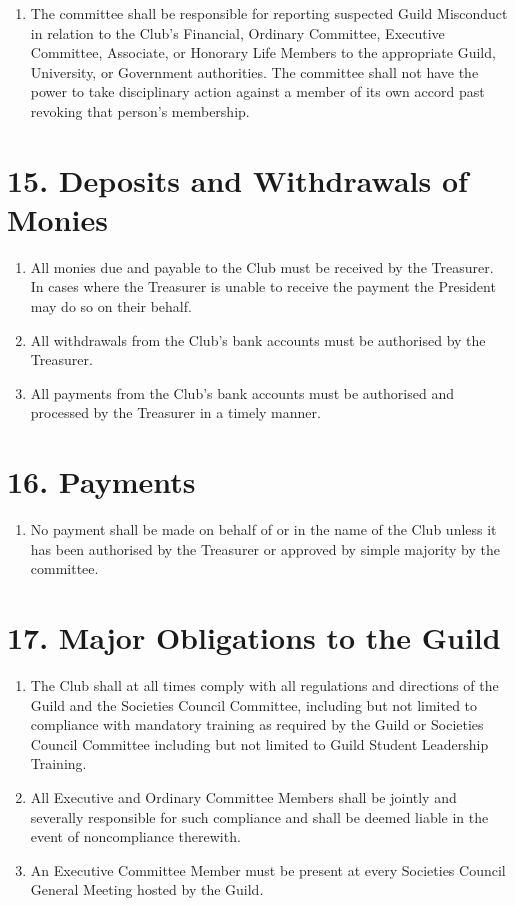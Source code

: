 \documentclass[12pt]{article}
\begin{document}
\begin{enumerate}[label=14.\arabic*]
\item The committee shall be responsible for reporting suspected Guild Misconduct in relation to the Club's Financial, Ordinary Committee, Executive Committee, Associate, or Honorary Life Members to the appropriate Guild, University, or Government authorities. The committee shall not have the power to take disciplinary action against a member of its own accord past revoking that person's membership.
\end{enumerate}

\section{15. Deposits and Withdrawals of Monies}
\begin{enumerate}[label=15.\arabic*]
 \item All monies due and payable to the Club must be received by the Treasurer. In cases where the Treasurer is unable to receive the payment the President may do so on their behalf.
\item All withdrawals from the Club's bank accounts must be authorised by the Treasurer.
\item All payments from the Club's bank accounts must be authorised and processed by the Treasurer in a timely manner.
\end{enumerate}
%
\section{16. Payments}
\begin{enumerate}[label=16.\arabic*]
 \item No payment shall be made on behalf of or in the name of the Club unless it has been authorised by the Treasurer or approved by simple majority by the committee.
\end{enumerate}

\section{17. Major Obligations to the Guild}
\begin{enumerate}[label=17.\arabic*]
 \item The Club shall at all times comply with all regulations and directions of the Guild and the Societies Council Committee, including but not limited to compliance with mandatory training as required by the Guild or Societies Council Committee including but not limited to Guild Student Leadership Training.
\item All Executive and Ordinary Committee Members shall be jointly and severally responsible for such compliance and shall be deemed liable in the event of noncompliance therewith.
\item An Executive Committee Member must be present at every Societies Council General Meeting hosted by the Guild.
\end{enumerate}
\end{document}
